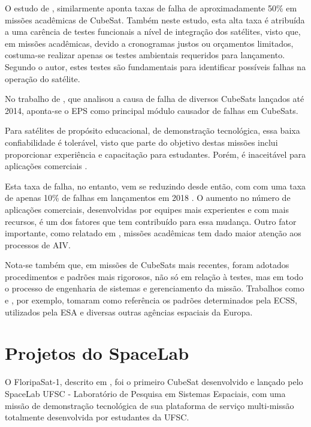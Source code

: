 O estudo de \textcite{first-100-cubesats}, similarmente aponta taxas de falha de aproximadamente 50\% em missões acadêmicas de CubeSat.
Também neste estudo, esta alta taxa é atribuída a uma carência de testes funcionais a nível de integração dos satélites, visto que, em missões acadêmicas, devido a cronogramas justos ou orçamentos limitados, costuma-se realizar apenas os testes ambientais requeridos para lançamento.
Segundo o autor, estes testes são fundamentais para identificar possíveis falhas na operação do satélite.

No trabalho de \textcite{reliability-of-cubesats}, que analisou a causa de falha de diversos CubeSats lançados até 2014, aponta-se o \gls{EPS} como principal módulo causador de falhas em CubeSats.

Para satélites de propósito educacional, de demonstração tecnológica, essa baixa confiabilidade é tolerável, visto que parte do objetivo destas missões inclui proporcionar experiência e capacitação para estudantes.
Porém, é inaceitável para aplicações comerciais \cite{overview-nanosat-test}.

Esta taxa de falha, no entanto, vem se reduzindo desde então, com com uma taxa de apenas 10\% de falhas em lançamentos em 2018 \cite{aiv-istsat-1}.
O aumento no número de aplicações comerciais, desenvolvidas por equipes mais experientes e com mais recursos, é um dos fatores que tem contribuído para essa mudança.
Outro fator importante, como relatado em \textcite{aiv-istsat-1}, missões acadêmicas tem dado maior atenção aos processos de \gls{AIV}.

Nota-se também que, em missões de CubeSats mais recentes, foram adotados procedimentos e padrões mais rigorosos, não só em relação à testes, mas em todo o processo de engenharia de sistemas e gerenciamento da missão.
Trabalhos como \textcite{floripasat-1} e \textcite{tailoring-ecss-nanosat}, por exemplo, tomaram como referência os padrões determinados pela \gls{ECSS}, utilizados pela \gls{ESA} e diversas outras agências espaciais da Europa.

\section{Projetos do SpaceLab}\label{sec:intro-spacelab}

O FloripaSat-1, descrito em \textcite{floripasat-1}, foi o primeiro CubeSat desenvolvido e lançado pelo SpaceLab UFSC - Laboratório de Pesquisa em Sistemas Espaciais, com uma missão de demonstração tecnológica de sua plataforma de serviço multi-missão totalmente desenvolvida por estudantes da \gls{UFSC}.

